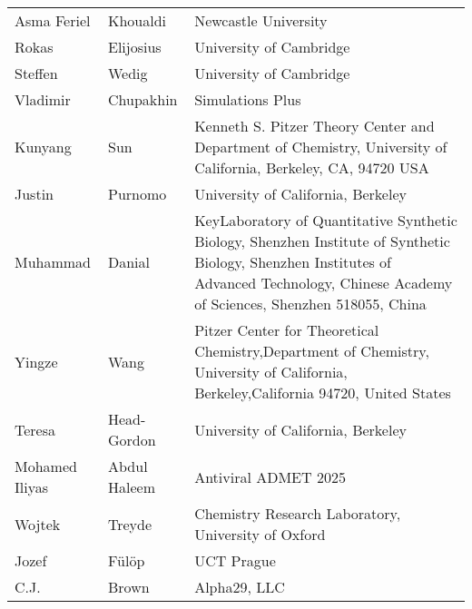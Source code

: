 \documentclass{article}
\begin{document}
\begin{table}[]
\begin{tabular}{lll}
\rowcolor[HTML]{FFFFFF} 
{\color[HTML]{434343} Asma Feriel} & {\color[HTML]{434343} Khoualdi} & {\color[HTML]{434343} Newcastle University} \\
\rowcolor[HTML]{F8F9FA} 
{\color[HTML]{434343} Rokas} & {\color[HTML]{434343} Elijosius} & {\color[HTML]{434343} University of Cambridge} \\
\rowcolor[HTML]{FFFFFF} 
{\color[HTML]{434343} Steffen} & {\color[HTML]{434343} Wedig} & {\color[HTML]{434343} University of Cambridge} \\
\rowcolor[HTML]{F8F9FA} 
{\color[HTML]{434343} Vladimir} & {\color[HTML]{434343} Chupakhin} & {\color[HTML]{434343} Simulations Plus} \\
\rowcolor[HTML]{FFFFFF} 
{\color[HTML]{434343} Kunyang} & {\color[HTML]{434343} Sun} & {\color[HTML]{434343} Kenneth S. Pitzer Theory Center and Department of Chemistry, University of California, Berkeley, CA, 94720 USA} \\
\rowcolor[HTML]{F8F9FA} 
{\color[HTML]{434343} Justin} & {\color[HTML]{434343} Purnomo} & {\color[HTML]{434343} University of California, Berkeley} \\
\rowcolor[HTML]{FFFFFF} 
{\color[HTML]{434343} Muhammad} & {\color[HTML]{434343} Danial} & {\color[HTML]{434343} KeyLaboratory of Quantitative Synthetic Biology, Shenzhen Institute of Synthetic Biology, Shenzhen Institutes of Advanced Technology, Chinese Academy of Sciences,  Shenzhen 518055, China} \\
\rowcolor[HTML]{F8F9FA} 
{\color[HTML]{434343} Yingze} & {\color[HTML]{434343} Wang} & {\color[HTML]{434343} Pitzer Center for Theoretical Chemistry,Department of Chemistry, University of California, Berkeley,California 94720, United States} \\
\rowcolor[HTML]{FFFFFF} 
{\color[HTML]{434343} Teresa} & {\color[HTML]{434343} Head-Gordon} & {\color[HTML]{434343} University of California, Berkeley} \\
\rowcolor[HTML]{F8F9FA} 
{\color[HTML]{434343} Mohamed Iliyas} & {\color[HTML]{434343} Abdul Haleem} & {\color[HTML]{434343} Antiviral ADMET 2025} \\
\rowcolor[HTML]{FFFFFF} 
{\color[HTML]{434343} Wojtek} & {\color[HTML]{434343} Treyde} & {\color[HTML]{434343} Chemistry Research Laboratory, University of Oxford} \\
\rowcolor[HTML]{F8F9FA} 
{\color[HTML]{434343} Jozef} & {\color[HTML]{434343} Fülöp} & {\color[HTML]{434343} UCT Prague} \\
\rowcolor[HTML]{FFFFFF} 
{\color[HTML]{434343} C.J.} & {\color[HTML]{434343} Brown} & {\color[HTML]{434343} Alpha29, LLC} \\

\end{tabular}
\end{table}
\end{document}
